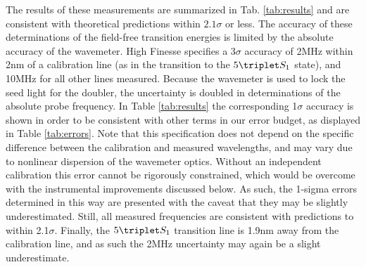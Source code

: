 	The results of these measurements are summarized in Tab.
	\ref{tab:results} and are consistent with theoretical predictions \cite{Morton06} within $2.1\sigma$ or less.
	The accuracy of these determinations of the field-free transition energies is limited by the absolute accuracy of the wavemeter.
	High Finesse specifies \cite{HighFinesseDoc} a 3$\sigma$ accuracy of 2MHz within 2nm of a calibration line (as in the transition to the $5\triplet S_1$ state), and 10MHz for all other lines measured.
	Because the wavemeter is used to lock the seed light for the doubler, the uncertainty is doubled in determinations of the absolute probe frequency.
	In Table \ref{tab:results} the corresponding 1$\sigma$ accuracy is shown in order to be consistent with other terms in our error budget, as displayed in Table \ref{tab:errors}.
	Note that this specification does not depend on the specific difference between the calibration and measured wavelengths, and may vary due to nonlinear dispersion of the wavemeter optics.
	Without an independent calibration this error cannot be rigorously constrained, which would be overcome with the instrumental improvements discussed below.
	As such, the 1-sigma errors determined in this way are presented with the caveat that they may be slightly underestimated.
	Still, all measured frequencies are consistent with predictions to within 2.1$\sigma$.
	Finally, the $5\triplet S_1$ transition line is 1.9nm away from the calibration line, and as such the 2MHz uncertainty may again be a slight underestimate.

